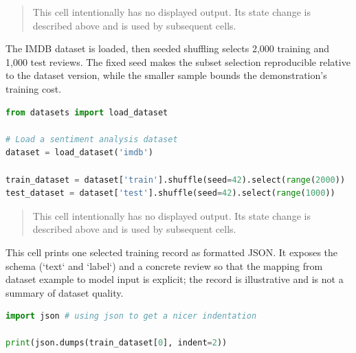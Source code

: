 \documentclass[../labs.tex]{subfiles}
\begin{document}
\hypertarget{out:lab03-bert-c28}{}\label{out:lab03-bert-c28}

\begin{quote}\small This cell intentionally has no displayed output. Its state change is described above and is used by subsequent cells.\end{quote}


The IMDB dataset is loaded, then seeded shuffling selects 2,000 training and 1,000 test reviews. The fixed seed makes the subset selection reproducible relative to the dataset version, while the smaller sample bounds the demonstration’s training cost.


\begin{lstlisting}[language=Python,basicstyle=\ttfamily\scriptsize,breaklines=true,breakatwhitespace=false,columns=fullflexible,keepspaces=true,numbers=none]
from datasets import load_dataset

# Load a sentiment analysis dataset
dataset = load_dataset('imdb')

train_dataset = dataset['train'].shuffle(seed=42).select(range(2000))
test_dataset = dataset['test'].shuffle(seed=42).select(range(1000))
\end{lstlisting}

\hypertarget{out:lab03-bert-c29}{}\label{out:lab03-bert-c29}

\begin{quote}\small This cell intentionally has no displayed output. Its state change is described above and is used by subsequent cells.\end{quote}


This cell prints one selected training record as formatted JSON. It exposes the schema (`text` and `label`) and a concrete review so that the mapping from dataset example to model input is explicit; the record is illustrative and is not a summary of dataset quality.


\begin{lstlisting}[language=Python,basicstyle=\ttfamily\scriptsize,breaklines=true,breakatwhitespace=false,columns=fullflexible,keepspaces=true,numbers=none]
import json # using json to get a nicer indentation

print(json.dumps(train_dataset[0], indent=2))
\end{lstlisting}
\end{document}
